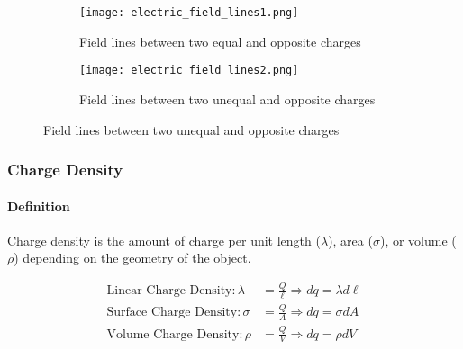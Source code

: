 \begin{figure}[h]
    \centering
    \begin{subfigure}{0.4\textwidth}
        \centering
        \texttt{[image: electric\_field\_lines1.png]}
        \caption{Field lines between two equal and opposite charges}
    \end{subfigure}%
    \hspace{0.1\textwidth}
    \begin{subfigure}{0.4\textwidth}
        \centering
        \texttt{[image: electric\_field\_lines2.png]}
        \caption{Field lines between two unequal and opposite charges}
    \end{subfigure}
\end{figure}

\hrulefill

\subsubsection*{Charge Density}
\paragraph*{Definition}
Charge density is the amount of charge per unit length ($\lambda$), area ($\sigma$), or volume ($\rho$) depending on the geometry of the object.

\begin{align*}
    \text{Linear Charge Density} : \lambda &= \frac{Q}{\ell} \Longrightarrow dq = \lambda d\ell\\
    \text{Surface Charge Density} : \sigma &= \frac{Q}{A} \Longrightarrow dq = \sigma dA\\
    \text{Volume Charge Density} : \rho &= \frac{Q}{V} \Longrightarrow dq = \rho dV
\end{align*}